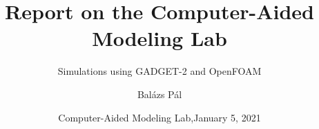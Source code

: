 \title[Computer-Aided Modeling Lab]
{Report on the Computer-Aided Modeling Lab}

\subtitle{Simulations using GADGET-2 and OpenFOAM}

\author[Balázs Pál]
{Balázs Pál}


\date[ELTE 2020]
{Computer-Aided Modeling Lab,\newline January 5, 2021}

